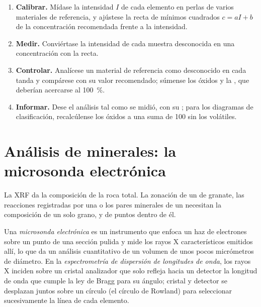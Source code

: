 \begin{method}\label{met:b2:field-lab-methods-2:calibration}
\begin{enumerate}
  \item \textbf{Calibrar.} Mídase la intensidad $I$ de cada elemento en perlas de varios materiales de
        referencia, y ajústese la recta de mínimos cuadrados $c = aI + b$ de la concentración recomendada
        frente a la intensidad.
  \item \textbf{Medir.} Conviértase la intensidad de cada muestra desconocida en una concentración con la recta.
  \item \textbf{Controlar.} Analícese un material de referencia como desconocido en cada tanda y compárese con
        su valor recomendado; súmense los óxidos y la , que deberían acercarse
        al \qty{100}{\percent}.
  \item \textbf{Informar.} Dese el análisis tal como se midió, con su ; para los
        diagramas de clasificación, recalcúlense los óxidos a una suma de 100 sin los volátiles.
\end{enumerate}
\end{method}

\section{Análisis de minerales: la microsonda electrónica}\label{sec:b2:field-lab-methods-2:microprobe}

La XRF da la composición de la roca total. La zonación de un  de granate, las reacciones
registradas por una  o los pares minerales de un  necesitan la composición de un solo
grano, y de puntos dentro de él.

\begin{definition}\label{def:b2:field-lab-methods-2:epma}
Una \emph{microsonda electrónica} es un instrumento que enfoca un haz de
electrones sobre un punto de una sección pulida y mide los rayos X característicos emitidos allí,
lo que da un análisis cuantitativo de un volumen de unos pocos micrómetros de diámetro. En la
\emph{espectrometría de dispersión de longitudes de onda}, los rayos X inciden
sobre un cristal analizador que solo refleja hacia un detector la longitud de onda que cumple la ley de Bragg para
su ángulo; cristal y detector se desplazan juntos sobre un círculo (el círculo de Rowland) para seleccionar sucesivamente la línea de cada
elemento.
\end{definition}

